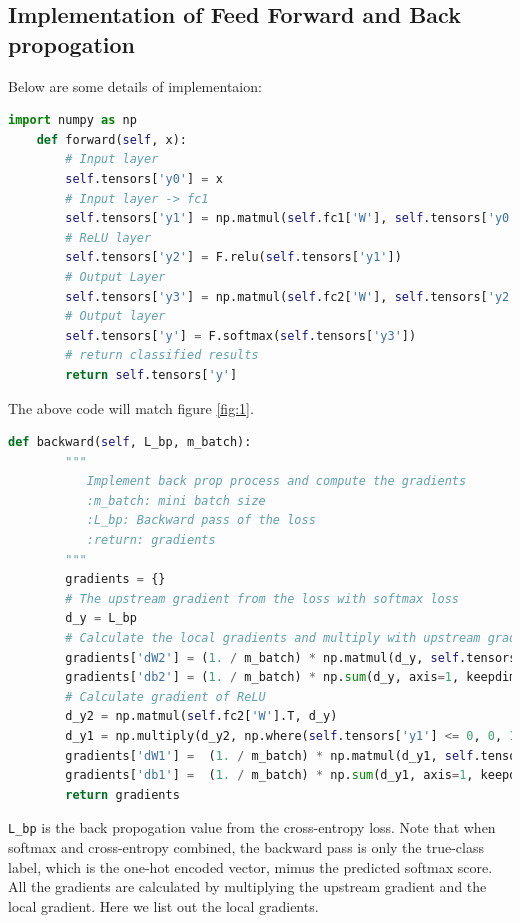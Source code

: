 \documentclass{article}
\begin{document}
    \subsection{Implementation of Feed Forward and Back propogation}
        Below are some details of implementaion:
        \begin{lstlisting}[language=python, caption=feed forward]
    import numpy as np
    def forward(self, x):
        # Input layer
        self.tensors['y0'] = x
        # Input layer -> fc1
        self.tensors['y1'] = np.matmul(self.fc1['W'], self.tensors['y0']) + self.fc1['b']
        # ReLU layer
        self.tensors['y2'] = F.relu(self.tensors['y1'])
        # Output Layer
        self.tensors['y3'] = np.matmul(self.fc2['W'], self.tensors['y2']) + self.fc2['b']
        # Output layer
        self.tensors['y'] = F.softmax(self.tensors['y3'])
        # return classified results
        return self.tensors['y']
        \end{lstlisting}
        The above code will match figure \ref{fig:1}.
        \begin{lstlisting}[language=python, caption=back propogation]
    def backward(self, L_bp, m_batch):
        """
           Implement back prop process and compute the gradients
           :m_batch: mini batch size
           :L_bp: Backward pass of the loss
           :return: gradients
        """
        gradients = {}
        # The upstream gradient from the loss with softmax loss
        d_y = L_bp
        # Calculate the local gradients and multiply with upstream gradient
        gradients['dW2'] = (1. / m_batch) * np.matmul(d_y, self.tensors['y2'].T)
        gradients['db2'] = (1. / m_batch) * np.sum(d_y, axis=1, keepdims=True)
        # Calculate gradient of ReLU
        d_y2 = np.matmul(self.fc2['W'].T, d_y)
        d_y1 = np.multiply(d_y2, np.where(self.tensors['y1'] <= 0, 0, 1))
        gradients['dW1'] =  (1. / m_batch) * np.matmul(d_y1, self.tensors['y0'].T)
        gradients['db1'] =  (1. / m_batch) * np.sum(d_y1, axis=1, keepdims=True)
        return gradients
        \end{lstlisting}
        \verb|L_bp| is the back propogation value from the cross-entropy loss.
        Note that when softmax and cross-entropy combined, the backward pass 
        is only the true-class label, which is the one-hot encoded vector, mimus
        the predicted softmax score. \\
        \indent All the gradients are calculated by multiplying the upstream 
        gradient and the local gradient. Here we list out the local gradients.
\end{document}
